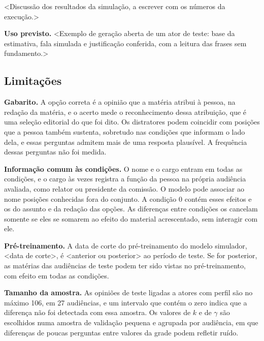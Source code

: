 <Discussão dos resultados da simulação, a escrever com os números da execução.>


\textbf{Uso previsto.} <Exemplo de geração aberta de um ator de teste: base da estimativa, fala
simulada e justificação conferida, com a leitura das frases sem fundamento.>

\subsection{Limitações}
\label{sec:limitacoes}

\textbf{Gabarito.} A opção correta é a opinião que a matéria atribui à pessoa, na redação da
matéria, e o acerto mede o reconhecimento dessa atribuição, que é uma seleção editorial do que foi
dito. Os distratores podem coincidir com posições que a pessoa também sustenta, sobretudo nas
condições que informam o lado dela, e essas perguntas admitem mais de uma resposta plausível. A
frequência dessas perguntas não foi medida.

\textbf{Informação comum às condições.} O nome e o cargo entram em todas as condições, e o cargo às
vezes registra a função da pessoa na própria audiência avaliada, como relator ou presidente da
comissão. O modelo pode associar ao nome posições conhecidas fora do conjunto. A condição 0 contém
esses efeitos e os do assunto e da redação das opções. As diferenças entre condições os cancelam
somente se eles se somarem ao efeito do material acrescentado, sem interagir com ele.

\textbf{Pré-treinamento.} A data de corte do pré-treinamento do modelo simulador, <data de corte>, é
<anterior ou posterior> ao período de teste. Se for posterior, as matérias das audiências de teste
podem ter sido vistas no pré-treinamento, com efeito em todas as condições.

\textbf{Tamanho da amostra.} As opiniões de teste ligadas a atores com perfil são no máximo 106, em
27 audiências, e um intervalo que contém o zero indica que a diferença não foi detectada com essa
amostra. Os valores de $k$ e de $\gamma$ são escolhidos numa amostra de validação pequena e agrupada
por audiência, em que diferenças de poucas perguntas entre valores da grade podem refletir ruído.

